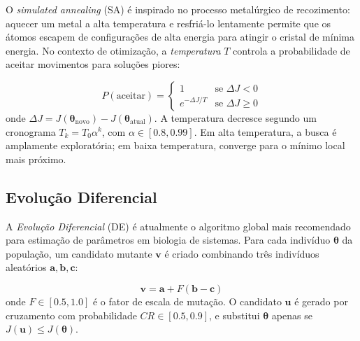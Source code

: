 O \emph{simulated annealing} (SA) é inspirado no processo metalúrgico de recozimento:
aquecer um metal a alta temperatura e resfriá-lo lentamente permite que os átomos escapem
de configurações de alta energia para atingir o cristal de mínima energia. No contexto de
otimização, a \emph{temperatura} $T$ controla a probabilidade de aceitar movimentos para
soluções piores:

\begin{equation}
P(\text{aceitar}) = \begin{cases}
1 & \text{se } \Delta J < 0 \\
e^{-\Delta J / T} & \text{se } \Delta J \geq 0
\end{cases}
\end{equation}
onde $\Delta J = J(\boldsymbol{\theta}_\text{novo}) - J(\boldsymbol{\theta}_\text{atual})$.
A temperatura decresce segundo um cronograma $T_k = T_0 \alpha^k$, com $\alpha \in [0.8, 0.99]$.
Em alta temperatura, a busca é amplamente exploratória; em baixa temperatura, converge para
o mínimo local mais próximo.

\subsection{Evolução Diferencial}

A \emph{Evolução Diferencial} (DE) é atualmente o algoritmo global mais recomendado para
estimação de parâmetros em biologia de sistemas. Para cada indivíduo $\boldsymbol{\theta}$
da população, um candidato mutante $\mathbf{v}$ é criado combinando três indivíduos
aleatórios $\mathbf{a}, \mathbf{b}, \mathbf{c}$:

\begin{equation}
\mathbf{v} = \mathbf{a} + F(\mathbf{b} - \mathbf{c})
\end{equation}
onde $F \in [0.5, 1.0]$ é o fator de escala de mutação. O candidato $\mathbf{u}$ é gerado
por cruzamento com probabilidade $CR \in [0.5, 0.9]$, e substitui $\boldsymbol{\theta}$
apenas se $J(\mathbf{u}) \leq J(\boldsymbol{\theta})$.

